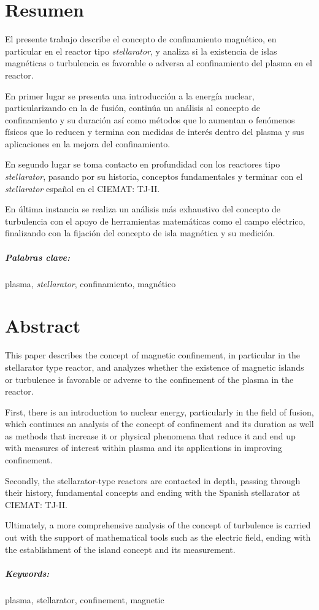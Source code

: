 \chapter*{Resumen}
El presente trabajo describe el concepto de confinamiento magnético, en particular en el reactor tipo \textit{stellarator}, y analiza si la existencia de islas magnéticas o turbulencia es favorable o adversa
al confinamiento del plasma en el reactor.\par
En primer lugar se presenta una introducción a la energía nuclear, particularizando en la de fusión, continúa
un análisis al concepto de confinamiento y su duración así como métodos que lo aumentan o fenómenos físicos que lo reducen y termina con medidas
de interés dentro del plasma y sus aplicaciones en la mejora del confinamiento.\par
En segundo lugar se toma contacto en profundidad con los reactores tipo \textit{stellarator}, pasando por su historia, 
conceptos fundamentales y terminar con el \textit{stellarator} español en el CIEMAT: TJ-II.\par
En última instancia se realiza un análisis más exhaustivo del concepto de turbulencia con el apoyo
de herramientas matemáticas como el campo eléctrico, finalizando con la fijación del concepto de isla
magnética y su medición.\par
\paragraph{Palabras clave:} plasma, \textit{stellarator}, confinamiento, magnético
\chapter*{Abstract}
This paper describes the concept of magnetic confinement, in particular in the stellarator type reactor, and analyzes whether the existence of magnetic islands or turbulence is favorable or adverse
to the confinement of the plasma in the reactor.\par
First, there is an introduction to nuclear energy, particularly in the field of fusion, which continues 
an analysis of the concept of confinement and its duration as well as methods that increase it or physical 
phenomena that reduce it and end up with measures of interest within plasma and its applications in improving confinement.\par
Secondly, the stellarator-type reactors are contacted in depth, passing through their history, 
fundamental concepts and ending with the Spanish stellarator at CIEMAT: TJ-II.\par
Ultimately, a more comprehensive analysis of the concept of turbulence is carried out with the support
of mathematical tools such as the electric field, ending with the establishment of the island concept
and its measurement.\par
\paragraph{Keywords:} plasma, stellarator, confinement, magnetic